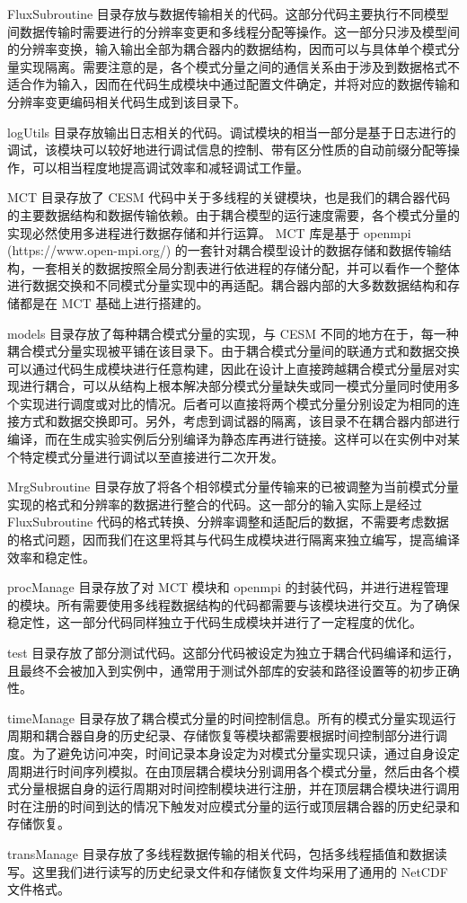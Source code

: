 FluxSubroutine 目录存放与数据传输相关的代码。这部分代码主要执行不同模型间数据传输时需要进行的分辨率变更和多线程分配等操作。这一部分只涉及模型间的分辨率变换，输入输出全部为耦合器内的数据结构，因而可以与具体单个模式分量实现隔离。需要注意的是，各个模式分量之间的通信关系由于涉及到数据格式不适合作为输入，因而在代码生成模块中通过配置文件确定，并将对应的数据传输和分辨率变更编码相关代码生成到该目录下。

logUtils 目录存放输出日志相关的代码。调试模块的相当一部分是基于日志进行的调试，该模块可以较好地进行调试信息的控制、带有区分性质的自动前缀分配等操作，可以相当程度地提高调试效率和减轻调试工作量。

MCT 目录存放了 CESM 代码中关于多线程的关键模块，也是我们的耦合器代码的主要数据结构和数据传输依赖。由于耦合模型的运行速度需要，各个模式分量的实现必然使用多进程进行数据存储和并行运算。 MCT 库是基于 openmpi (https://www.open-mpi.org/) 的一套针对耦合模型设计的数据存储和数据传输结构，一套相关的数据按照全局分割表进行依进程的存储分配，并可以看作一个整体进行数据交换和不同模式分量实现中的再适配。耦合器内部的大多数数据结构和存储都是在 MCT 基础上进行搭建的。

models 目录存放了每种耦合模式分量的实现，与 CESM 不同的地方在于，每一种耦合模式分量实现被平铺在该目录下。由于耦合模式分量间的联通方式和数据交换可以通过代码生成模块进行任意构建，因此在设计上直接跨越耦合模式分量层对实现进行耦合，可以从结构上根本解决部分模式分量缺失或同一模式分量同时使用多个实现进行调度或对比的情况。后者可以直接将两个模式分量分别设定为相同的连接方式和数据交换即可。另外，考虑到调试器的隔离，该目录不在耦合器内部进行编译，而在生成实验实例后分别编译为静态库再进行链接。这样可以在实例中对某个特定模式分量进行调试以至直接进行二次开发。

MrgSubroutine 目录存放了将各个相邻模式分量传输来的已被调整为当前模式分量实现的格式和分辨率的数据进行整合的代码。这一部分的输入实际上是经过 FluxSubroutine 代码的格式转换、分辨率调整和适配后的数据，不需要考虑数据的格式问题，因而我们在这里将其与代码生成模块进行隔离来独立编写，提高编译效率和稳定性。

procManage 目录存放了对 MCT 模块和 openmpi 的封装代码，并进行进程管理的模块。所有需要使用多线程数据结构的代码都需要与该模块进行交互。为了确保稳定性，这一部分代码同样独立于代码生成模块并进行了一定程度的优化。

test 目录存放了部分测试代码。这部分代码被设定为独立于耦合代码编译和运行，且最终不会被加入到实例中，通常用于测试外部库的安装和路径设置等的初步正确性。

timeManage 目录存放了耦合模式分量的时间控制信息。所有的模式分量实现运行周期和耦合器自身的历史纪录、存储恢复等模块都需要根据时间控制部分进行调度。为了避免访问冲突，时间记录本身设定为对模式分量实现只读，通过自身设定周期进行时间序列模拟。在由顶层耦合模块分别调用各个模式分量，然后由各个模式分量根据自身的运行周期对时间控制模块进行注册，并在顶层耦合模块进行调用时在注册的时间到达的情况下触发对应模式分量的运行或顶层耦合器的历史纪录和存储恢复。

transManage 目录存放了多线程数据传输的相关代码，包括多线程插值和数据读写。这里我们进行读写的历史纪录文件和存储恢复文件均采用了通用的 NetCDF 文件格式。